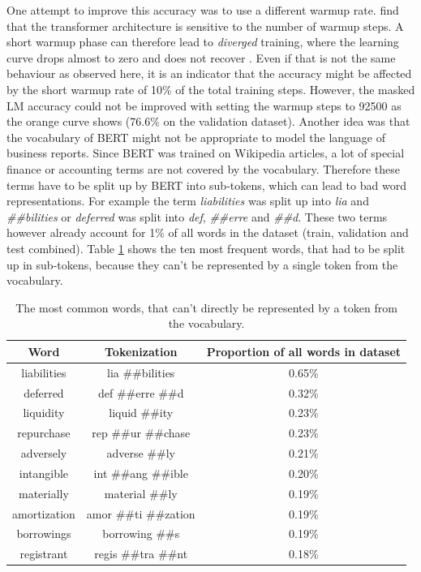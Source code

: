 One attempt to improve this accuracy was to use a different warmup rate.
\cite{Popel2018} find that the transformer architecture is sensitive to the number of warmup steps.
A short warmup phase can therefore lead to \textit{diverged} training, where the learning curve drops almost to zero and does not recover \cite[p. 60]{Popel2018}.
Even if that is not the same behaviour as observed here, it is an indicator that the accuracy might be affected by the short warmup rate of 10\% of the total training steps.
However, the masked LM accuracy could not be improved with setting the warmup steps to 92500 as the orange curve shows (76.6\% on the validation dataset).
Another idea was that the vocabulary of \ac{BERT} might not be appropriate to model the language of business reports.
Since BERT was trained on Wikipedia articles, a lot of special finance or accounting terms are not covered by the vocabulary.
Therefore these terms have to be split up by \ac{BERT} into sub-tokens, which can lead to bad word representations.
For example the term \textit{liabilities} was split up into \textit{lia} and \textit{\#\#bilities} or \textit{deferred} was split into \textit{def}, \textit{\#\#erre} and \textit{\#\#d}.
These two terms however already account for 1\% of all words in the dataset (train, validation and test combined).
Table \ref{table:not_in_vocab_words} shows the ten most frequent words, that had to be split up in sub-tokens, because they can't be represented by a single token from the vocabulary.
\begin{table}[h]
    \centering
    \begin{tabular}{ c  c  c }
        Word & Tokenization & Proportion of all words in dataset \\ \hline
        liabilities & lia \#\#bilities & 0.65\% \\
        deferred & def \#\#erre \#\#d & 0.32\% \\
        liquidity & liquid \#\#ity & 0.23\% \\
        repurchase & rep \#\#ur \#\#chase & 0.23\% \\
        adversely & adverse \#\#ly & 0.21\% \\
        intangible & int \#\#ang \#\#ible & 0.20\% \\
        materially & material \#\#ly & 0.19\% \\
        amortization & amor \#\#ti \#\#zation & 0.19\% \\
        borrowings & borrowing \#\#s & 0.19\% \\
        registrant & regis \#\#tra \#\#nt & 0.18\% \\
    \end{tabular}
    \caption{The most common words, that can't directly be represented by a token from the vocabulary.}
    \label{table:not_in_vocab_words}
\end{table}

